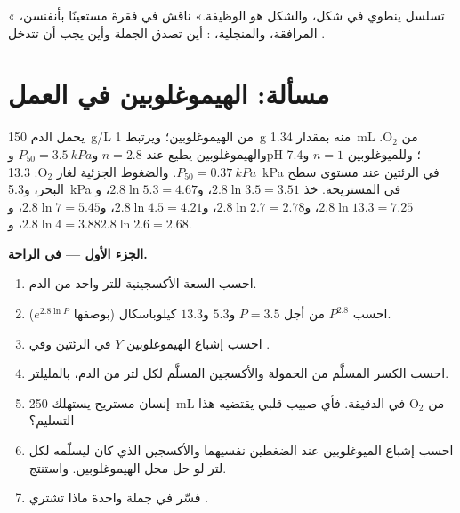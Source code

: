 \begin{exercise}[$\star\star\star$]\label{exo:b1:proteins:12}
« تسلسل ينطوي في شكل، والشكل هو الوظيفة.» ناقش في فقرة
مستعينًا بأنفنسن،  المرافقة، والمنجلية، : أين
تصدق الجملة وأين يجب أن تتدخل .
\end{exercise}

\section{مسألة: الهيموغلوبين في العمل}

\begin{problem}
\label{pb:b1:proteins:1}
يحمل الدم \qty{150}{g/L} من الهيموغلوبين؛ ويرتبط \qty{1}{g} منه
بمقدار \qty{1.34}{mL} من $\mathrm{O_2}$. والهيموغلوبين يطيع 
عند $n = 2.8$ و$P_{50} = \qty{3.5}{kPa}$ وpH 7.4؛ وللميوغلوبين
$n = 1$ و$P_{50} = \qty{0.37}{kPa}$. والضغوط الجزئية
لغاز $\mathrm{O_2}$: \qty{13.3}{kPa} في الرئتين عند مستوى سطح البحر،
و\qty{5.3}{kPa} في  المستريحة. خذ $2.8\ln 3.5 = 3.51$،
و$2.8\ln 5.3 = 4.67$، و$2.8\ln 13.3 = 7.25$، و$2.8\ln 2.7 = 2.78$،
و$2.8\ln 4.5 = 4.21$، و$2.8\ln 7 = 5.45$، و$2.8\ln 4 = 3.88$،
و$2.8\ln 2.6 = 2.68$.

\medskip
\noindent\textbf{الجزء الأول --- في الراحة.}
\begin{enumerate}
  \item احسب السعة الأكسجينية للتر واحد من الدم.
  \item احسب $P^{2.8}$ من أجل $P = 3.5$ و$5.3$ و$13.3$ كيلوباسكال
        (بوصفها $e^{2.8\ln P}$).
  \item احسب إشباع الهيموغلوبين $Y$ في الرئتين وفي .
  \item احسب الكسر المسلَّم من الحمولة والأكسجين المسلَّم لكل لتر من
        الدم، بالمليلتر.
  \item إنسان مستريح يستهلك \qty{250}{mL} من $\mathrm{O_2}$ في
        الدقيقة. فأي صبيب قلبي يقتضيه هذا التسليم؟
  \item احسب إشباع الميوغلوبين عند الضغطين نفسيهما والأكسجين الذي كان
        ليسلّمه لكل لتر لو حل محل الهيموغلوبين. واستنتج.
  \item فسّر في جملة واحدة ماذا تشتري .
\end{enumerate}


\end{problem}
